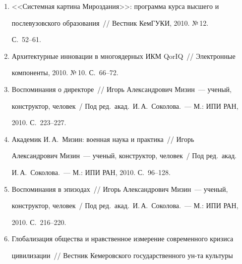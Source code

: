 \begin{enumerate}[1.]
безопасность~/\!\!/  Погранология: Мат-лы постоянно действующего 


межведомственного научного семинара.~--- М.: Пограничная академия ФСБ 


России, 2010. №\,3. С.~34--42.


\item {}


<<Системная картина Мироздания>>: программа курса высшего и 


послевузовского образования~/\!\!/  Вестник \mbox{КемГУКИ}, 2010. №\,12. 


С.~52--61.


\item {}


Архитектурные инновации в многоядерных ИКМ QorIQ~/\!\!/  Электронные 


компоненты, 2010. №\,10. С.~66--72.





\item {}


Воспоминания о директоре~/\!\!/  Игорь Александрович Мизин~--- ученый, 


конструктор, человек~/ Под ред.\ акад.\ И.\,А.~Соколова.~--- М.: ИПИ РАН, 


2010. С.~223--227.


\item {}


Академик  И.\,А.~Мизин: военная наука и практика~/\!\!/  Игорь 


Александрович Мизин~--- ученый, конструктор, человек~/ Под ред.\ акад.\ 


И.\,А.~Соколова.~--- М.: ИПИ РАН, 2010. С.~96--128.


\item {}


Воспоминания в эпизодах~/\!\!/  Игорь Александрович Мизин~--- ученый, 


конструктор, человек~/ Под ред.\ акад.\ И.\,А.~Соколова.~--- М.: ИПИ РАН, 


2010. С.~216--220.


\item {}


Глобализация общества и нравственное измерение современного кризиса 


цивилизации~/\!\!/  Вестник Кемеровского государственного ун-та культуры 



\end{enumerate}
